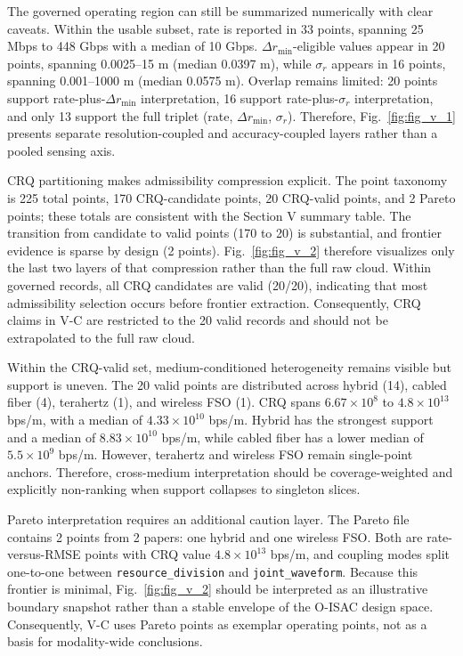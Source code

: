 \documentclass[lettersize,journal]{IEEEtran}
\begin{document}
The governed operating region can still be summarized numerically with clear caveats. Within the usable subset, rate is reported in 33 points, spanning 25 Mbps to 448 Gbps with a median of 10 Gbps. $\Delta r_{\min}$-eligible values appear in 20 points, spanning 0.0025--15 m (median 0.0397 m), while $\sigma_r$ appears in 16 points, spanning 0.001--1000 m (median 0.0575 m). Overlap remains limited: 20 points support rate-plus-$\Delta r_{\min}$ interpretation, 16 support rate-plus-$\sigma_r$ interpretation, and only 13 support the full triplet (rate, $\Delta r_{\min}$, $\sigma_r$). Therefore, Fig.~\ref{fig:fig_v_1} presents separate resolution-coupled and accuracy-coupled layers rather than a pooled sensing axis.

CRQ partitioning makes admissibility compression explicit. The point taxonomy is 225 total points, 170 CRQ-candidate points, 20 CRQ-valid points, and 2 Pareto points; these totals are consistent with the Section V summary table. The transition from candidate to valid points (170 to 20) is substantial, and frontier evidence is sparse by design (2 points). Fig.~\ref{fig:fig_v_2} therefore visualizes only the last two layers of that compression rather than the full raw cloud. Within governed records, all CRQ candidates are valid (20/20), indicating that most admissibility selection occurs before frontier extraction. Consequently, CRQ claims in V-C are restricted to the 20 valid records and should not be extrapolated to the full raw cloud.

Within the CRQ-valid set, medium-conditioned heterogeneity remains visible but support is uneven. The 20 valid points are distributed across hybrid (14), cabled fiber (4), terahertz (1), and wireless FSO (1). CRQ spans $6.67 \times 10^8$ to $4.8 \times 10^{13}$ bps/m, with a median of $4.33 \times 10^{10}$ bps/m. Hybrid has the strongest support and a median of $8.83 \times 10^{10}$ bps/m, while cabled fiber has a lower median of $5.5 \times 10^9$ bps/m. However, terahertz and wireless FSO remain single-point anchors. Therefore, cross-medium interpretation should be coverage-weighted and explicitly non-ranking when support collapses to singleton slices.

Pareto interpretation requires an additional caution layer. The Pareto file contains 2 points from 2 papers: one hybrid and one wireless FSO. Both are rate-versus-RMSE points with CRQ value $4.8 \times 10^{13}$ bps/m, and coupling modes split one-to-one between \texttt{resource\_division} and \texttt{joint\_waveform}. Because this frontier is minimal, Fig.~\ref{fig:fig_v_2} should be interpreted as an illustrative boundary snapshot rather than a stable envelope of the O-ISAC design space. Consequently, V-C uses Pareto points as exemplar operating points, not as a basis for modality-wide conclusions.
\end{document}
